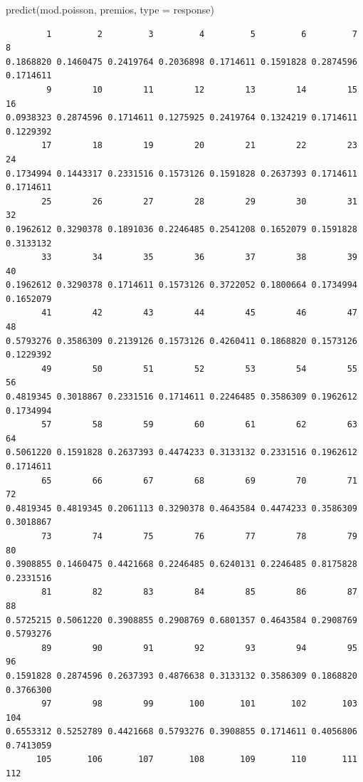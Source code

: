 \documentclass[
  letterpaper,
  DIV=11,
  numbers=noendperiod]{scrreprt}
\newenvironment{Shaded}{\begin{snugshade}}{\end{snugshade}}
\newcommand{\AttributeTok}[1]{\textcolor[rgb]{0.40,0.45,0.13}{#1}}
\newcommand{\FunctionTok}[1]{\textcolor[rgb]{0.28,0.35,0.67}{#1}}
\newcommand{\NormalTok}[1]{\textcolor[rgb]{0.00,0.23,0.31}{#1}}
\newcommand{\StringTok}[1]{\textcolor[rgb]{0.13,0.47,0.30}{#1}}
\begin{document}
\begin{Shaded}
\begin{Highlighting}[]
\FunctionTok{predict}\NormalTok{(mod.poisson, premios, }\AttributeTok{type =} \StringTok{\textquotesingle{}response\textquotesingle{}}\NormalTok{)}
\end{Highlighting}
\end{Shaded}

\begin{verbatim}
        1         2         3         4         5         6         7         8 
0.1868820 0.1460475 0.2419764 0.2036898 0.1714611 0.1591828 0.2874596 0.1714611 
        9        10        11        12        13        14        15        16 
0.0938323 0.2874596 0.1714611 0.1275925 0.2419764 0.1324219 0.1714611 0.1229392 
       17        18        19        20        21        22        23        24 
0.1734994 0.1443317 0.2331516 0.1573126 0.1591828 0.2637393 0.1714611 0.1714611 
       25        26        27        28        29        30        31        32 
0.1962612 0.3290378 0.1891036 0.2246485 0.2541208 0.1652079 0.1591828 0.3133132 
       33        34        35        36        37        38        39        40 
0.1962612 0.3290378 0.1714611 0.1573126 0.3722052 0.1800664 0.1734994 0.1652079 
       41        42        43        44        45        46        47        48 
0.5793276 0.3586309 0.2139126 0.1573126 0.4260411 0.1868820 0.1573126 0.1229392 
       49        50        51        52        53        54        55        56 
0.4819345 0.3018867 0.2331516 0.1714611 0.2246485 0.3586309 0.1962612 0.1734994 
       57        58        59        60        61        62        63        64 
0.5061220 0.1591828 0.2637393 0.4474233 0.3133132 0.2331516 0.1962612 0.1714611 
       65        66        67        68        69        70        71        72 
0.4819345 0.4819345 0.2061113 0.3290378 0.4643584 0.4474233 0.3586309 0.3018867 
       73        74        75        76        77        78        79        80 
0.3908855 0.1460475 0.4421668 0.2246485 0.6240131 0.2246485 0.8175828 0.2331516 
       81        82        83        84        85        86        87        88 
0.5725215 0.5061220 0.3908855 0.2908769 0.6801357 0.4643584 0.2908769 0.5793276 
       89        90        91        92        93        94        95        96 
0.1591828 0.2874596 0.2637393 0.4876638 0.3133132 0.3586309 0.1868820 0.3766300 
       97        98        99       100       101       102       103       104 
0.6553312 0.5252789 0.4421668 0.5793276 0.3908855 0.1714611 0.4056806 0.7413059 
      105       106       107       108       109       110       111       112 

\end{verbatim}
\end{document}
